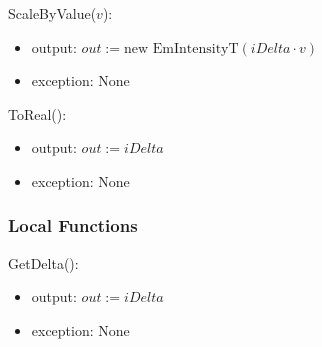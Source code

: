 \noindent ScaleByValue($v$):
\begin{itemize}

    \item output: $out := \text{new EmIntensityT}(\mathit{iDelta} \cdot v)$

    \item exception: None

\end{itemize}

\noindent ToReal():
\begin{itemize}

    \item output: $out := \mathit{iDelta}$

    \item exception: None

\end{itemize}

\subsubsection{Local Functions}
\noindent GetDelta():
\begin{itemize}

    \item output: $out := \mathit{iDelta}$

    \item exception: None

\end{itemize}